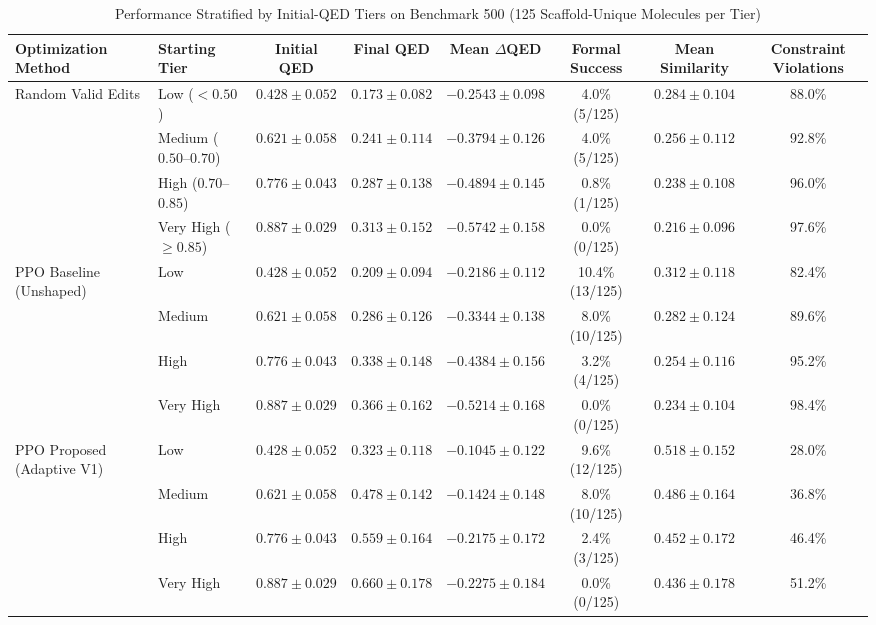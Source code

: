 \documentclass{ieeeaccess}
\begin{document}
\begin{table}[!tbp]
\caption{Performance Stratified by Initial-QED Tiers on Benchmark 500 (125 Scaffold-Unique Molecules per Tier)}
\label{tab:tier_stratified}
\centering
\footnotesize
\begin{tabularx}{\textwidth}{l l c c c c c c}
\toprule
\textbf{Optimization Method} & \textbf{Starting Tier} & \textbf{Initial QED} & \textbf{Final QED} & \textbf{Mean $\Delta$QED} & \textbf{Formal Success} & \textbf{Mean Similarity} & \textbf{Constraint Violations}\\
\midrule
\multirow{4}{*}{Random Valid Edits} & Low ($<0.50$) & $0.428 \pm 0.052$ & $0.173 \pm 0.082$ & $-0.2543 \pm 0.098$ & 4.0\% (5/125) & $0.284 \pm 0.104$ & 88.0\%\\
 & Medium ($0.50$--$0.70$) & $0.621 \pm 0.058$ & $0.241 \pm 0.114$ & $-0.3794 \pm 0.126$ & 4.0\% (5/125) & $0.256 \pm 0.112$ & 92.8\%\\
 & High ($0.70$--$0.85$) & $0.776 \pm 0.043$ & $0.287 \pm 0.138$ & $-0.4894 \pm 0.145$ & 0.8\% (1/125) & $0.238 \pm 0.108$ & 96.0\%\\
 & Very High ($\ge0.85$) & $0.887 \pm 0.029$ & $0.313 \pm 0.152$ & $-0.5742 \pm 0.158$ & 0.0\% (0/125) & $0.216 \pm 0.096$ & 97.6\%\\
\midrule
\multirow{4}{*}{PPO Baseline (Unshaped)} & Low & $0.428 \pm 0.052$ & $0.209 \pm 0.094$ & $-0.2186 \pm 0.112$ & 10.4\% (13/125) & $0.312 \pm 0.118$ & 82.4\%\\
 & Medium & $0.621 \pm 0.058$ & $0.286 \pm 0.126$ & $-0.3344 \pm 0.138$ & 8.0\% (10/125) & $0.282 \pm 0.124$ & 89.6\%\\
 & High & $0.776 \pm 0.043$ & $0.338 \pm 0.148$ & $-0.4384 \pm 0.156$ & 3.2\% (4/125) & $0.254 \pm 0.116$ & 95.2\%\\
 & Very High & $0.887 \pm 0.029$ & $0.366 \pm 0.162$ & $-0.5214 \pm 0.168$ & 0.0\% (0/125) & $0.234 \pm 0.104$ & 98.4\%\\
\midrule
\multirow{4}{*}{PPO Proposed (Adaptive V1)} & Low & $0.428 \pm 0.052$ & $0.323 \pm 0.118$ & $-0.1045 \pm 0.122$ & 9.6\% (12/125) & $0.518 \pm 0.152$ & 28.0\%\\
 & Medium & $0.621 \pm 0.058$ & $0.478 \pm 0.142$ & $-0.1424 \pm 0.148$ & 8.0\% (10/125) & $0.486 \pm 0.164$ & 36.8\%\\
 & High & $0.776 \pm 0.043$ & $0.559 \pm 0.164$ & $-0.2175 \pm 0.172$ & 2.4\% (3/125) & $0.452 \pm 0.172$ & 46.4\%\\
 & Very High & $0.887 \pm 0.029$ & $0.660 \pm 0.178$ & $-0.2275 \pm 0.184$ & 0.0\% (0/125) & $0.436 \pm 0.178$ & 51.2\%\\

\end{tabularx}
\end{table}
\end{document}
